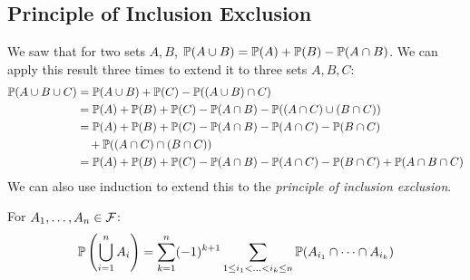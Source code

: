 \documentclass[../main.tex]{subfiles}
\begin{document}
\subsection{Principle of Inclusion Exclusion}
We saw that for two sets $A, B$, $\P(A \cup B) = \P(A) + \P(B) - \P(A \cap B)$.
We can apply this result three times to extend it to three sets $A, B, C$:
\begin{align*}
  \P(A \cup B \cup C) &= \P(A \cup B) + \P(C) - \P((A \cup B) \cap C) \\
                      &= \P(A) + \P(B) + \P(C) - \P(A \cap B) - \P((A \cap C) \cup (B \cap C)) \\
                      &= \P(A) + \P(B) + \P(C) - \P(A \cap B) - \P(A \cap C) - \P (B \cap C) \\
                      &\quad + \P((A \cap C) \cap (B \cap C)) \\
                      &= \P(A) + \P(B) + \P(C) - \P(A \cap B) - \P(A \cap C) - \P(B \cap C) + \P(A \cap B \cap C)
\end{align*}
We can also use induction to extend this to the \textit{principle of inclusion exclusion}.
\begin{proposition}
  For $A_1, \ldots, A_n \in \salg$:
  \[
    \P\left(\bigcup_{i = 1}^{n} A_i\right) = \sum_{k = 1}^{n} (-1)^{k + 1} \sum_{1 \leq i_1 < \ldots < i_k \leq n} \P(A_{i_1} \cap \cdots \cap A_{i_k})
  \]
  \label{inclusionExclusion}
\end{proposition}
\end{document}
